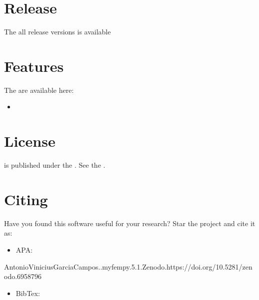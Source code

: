 \documentclass[letterpaper,10pt,english]{sphinxmanual}
\begin{document}
\chapter{Release}
\label{\detokenize{index:release}}
\sphinxAtStartPar
The all release versions is available


\chapter{Features}
\label{\detokenize{index:features}}
\sphinxAtStartPar
The  are available here:
\begin{itemize}
\item {} 
\sphinxAtStartPar
{}

\end{itemize}


\chapter{License}
\label{\detokenize{index:license}}
\sphinxAtStartPar
{} is published under the . See the
.




\chapter{Citing}
\label{\detokenize{index:citing}}
\sphinxAtStartPar
Have you found this software useful for your research? Star the project
and cite it as:
\begin{itemize}
\item {} 
\sphinxAtStartPar
APA:

\end{itemize}

\begin{sphinxVerbatim}[commandchars=\\\{\}]
AntonioViniciusGarciaCampos..myfempy.5.1.Zenodo.https://doi.org/10.5281/zenodo.6958796
\end{sphinxVerbatim}
\begin{itemize}
\item {} 
\sphinxAtStartPar
BibTex:

\end{itemize}
\end{document}
